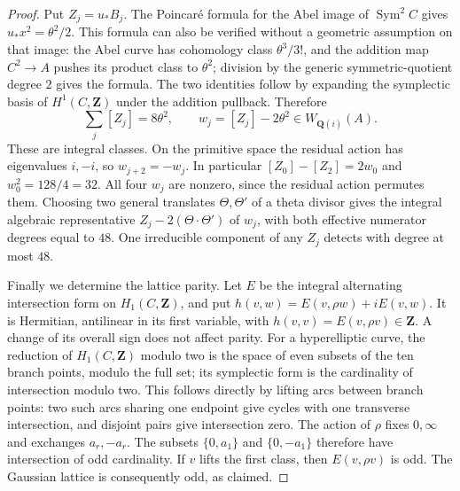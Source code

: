 \documentclass[11pt]{article}
\theoremstyle{definition}
\theoremstyle{remark}
\begin{document}
\begin{proof}
Put $Z_j=u_*B_j$.  The Poincar\'e formula for the Abel image of
$\operatorname{Sym}^2C$ gives $u_*x^2=\theta^2/2$.  This formula
can also be verified without a geometric assumption on that image:
the Abel curve has cohomology class $\theta^3/3!$, and the addition
map $C^2\to A$ pushes its product class to $\theta^2$; division
by the generic symmetric-quotient degree $2$ gives the formula.
The two identities follow by expanding the symplectic basis of
$H^1(C,\mathbf Z)$ under the addition pullback.  Therefore
\[
 \sum_j[Z_j]=8\theta^2,\qquad
 w_j=[Z_j]-2\theta^2\in W_{\mathbf Q(i)}(A).
\]
These are integral classes.  On the primitive space the residual action
has eigenvalues $i,-i$, so $w_{j+2}=-w_j$.  In particular
$[Z_0]-[Z_2]=2w_0$ and $w_0^2=128/4=32$.  All four $w_j$ are nonzero,
since the residual action permutes them.  Choosing two general translates
$\Theta,\Theta'$ of a theta divisor gives the integral algebraic
representative $Z_j-2(\Theta\cdot\Theta')$ of $w_j$, with both
effective numerator degrees equal to $48$.  One irreducible component
of any $Z_j$ detects with degree at most $48$.

Finally we determine the lattice parity.  Let $E$ be the integral
alternating intersection form on $H_1(C,\mathbf Z)$, and put
$h(v,w)=E(v,\rho w)+iE(v,w)$.  It is Hermitian, antilinear in its
first variable, with $h(v,v)=E(v,\rho v)\in\mathbf Z$.
A change of its overall sign does not affect parity.
For a hyperelliptic curve, the reduction of $H_1(C,\mathbf Z)$ modulo
two is the space of even subsets of the ten branch points, modulo the
full set; its symplectic form is the cardinality of intersection modulo
two.  This follows directly by lifting arcs between branch points:
two such arcs sharing one endpoint give cycles with one transverse
intersection, and disjoint pairs give intersection zero.  The action of
$\rho$ fixes $0,\infty$ and exchanges $a_r,-a_r$.
The subsets $\{0,a_1\}$ and $\{0,-a_1\}$ therefore have intersection
of odd cardinality.  If $v$ lifts the first class, then
$E(v,\rho v)$ is odd.  The Gaussian lattice is consequently odd,
as claimed.
\end{proof}
\end{document}
